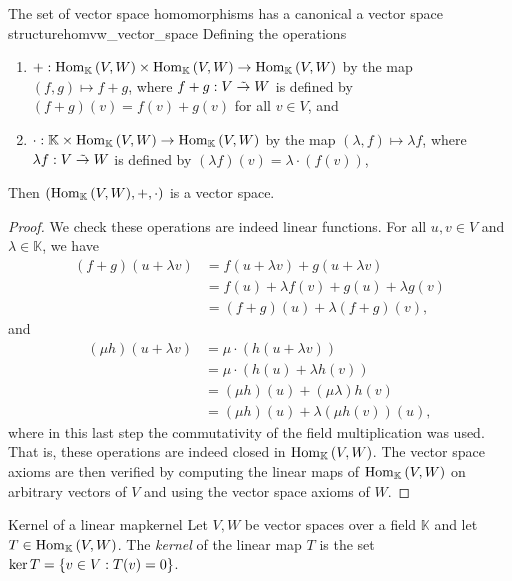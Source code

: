 \begin{proposition}{The set of vector space homomorphisms has a canonical a vector space structure}{homvw_vector_space}
    Defining the operations
    \begin{enumerate}[label=(\alph*)]
        \item \(+: \Hom[\mathbb{K}]{V,W} \times \Hom[\mathbb{K}]{V,W} \to \Hom[\mathbb{K}]{V,W}\) by the map \((f,g) \mapsto f + g\), where \(f+g : V \linear W\) is defined by \((f+g)(v) = f(v) + g(v)\) for all \(v \in V\), and
        \item \(\cdot : \mathbb{K} \times \Hom[\mathbb{K}]{V, W} \to \Hom[\mathbb{K}]{V, W}\) by the map \((\lambda, f) \mapsto \lambda f\), where \(\lambda f : V \linear W\) is defined by \((\lambda f)(v) =\lambda\cdot (f(v)) \),
    \end{enumerate}
    Then \((\Hom[\mathbb{K}]{V,W}, +, \cdot)\) is a vector space.
\end{proposition}
\begin{proof}
    We check these operations are indeed linear functions. For all \(u, v \in V\) and \(\lambda \in \mathbb{K}\), we have
    \begin{align*}
        (f+g)(u + \lambda v) &= f(u + \lambda v) + g(u + \lambda v)\\
                             &= f(u) + \lambda f(v) + g(u) + \lambda g(v)\\
                             &= (f+g)(u) + \lambda (f+g)(v),
    \end{align*}
    and
    \begin{align*}
        (\mu h)(u + \lambda v) &= \mu \cdot ( h(u + \lambda v))\\
                               &= \mu \cdot ( h(u) + \lambda h(v))\\
                               &= (\mu h)(u) + (\mu \lambda) h(v)\\
                               &= (\mu h)(u) + \lambda (\mu h(v))(u),
    \end{align*}
    where in this last step the commutativity of the field multiplication was used. That is, these operations are indeed closed in \(\Hom[\mathbb{K}]{V, W}\). The vector space axioms are then verified by computing the linear maps of \(\Hom[\mathbb{K}]{V,W}\) on arbitrary vectors of \(V\) and using the vector space axioms of \(W\).
\end{proof}

\begin{definition}{Kernel of a linear map}{kernel}
    Let \(V, W\) be vector spaces over a field \(\mathbb{K}\) and let \(T \in \Hom[\mathbb{K}]{V,W}\). The \emph{kernel} of the linear map \(T\) is the set \(\ker T = \set{v \in V : T(v) = 0}\).
\end{definition}


